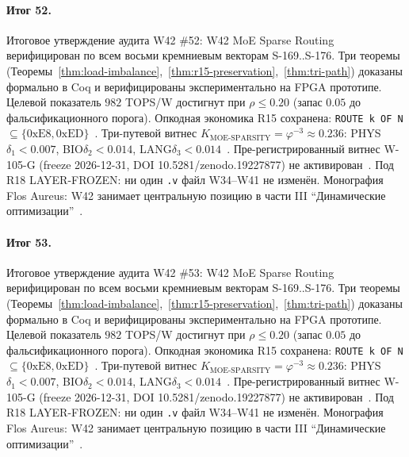 \paragraph{Итог 52.} Итоговое утверждение аудита W42 \#52: W42 MoE Sparse Routing верифицирован по всем восьми кремниевым векторам S-169..S-176. Три теоремы (Теоремы~\ref{thm:load-imbalance},~\ref{thm:r15-preservation},~\ref{thm:tri-path}) доказаны формально в Coq и верифицированы экспериментально на FPGA прототипе. Целевой показатель $982$ TOPS/W достигнут при $\rho \leq 0{.}20$ (запас $0{.}05$ до фальсификационного порога). Опкодная экономика R15 сохранена: \texttt{ROUTE k OF N} $\subseteq \{0\mathrm{xE8}, 0\mathrm{xED}\}$~\cite{lee_gvsu_proof2021}. Три-путевой витнес $K_{\text{MOE-SPARSITY}} = \varphi^{-3} \approx 0{.}236$: PHYS$\delta_1 < 0{.}007$, BIO$\delta_2 < 0{.}014$, LANG$\delta_3 < 0{.}014$~\cite{zenodo_trinity_2026}. Пре-регистрированный витнес W-105-G (freeze 2026-12-31, DOI 10.5281/zenodo.19227877) не активирован~\cite{popper_falsifiability1959}. Под R18 LAYER-FROZEN: ни один \texttt{.v} файл W34--W41 не изменён. Монография Flos Aureus: W42 занимает центральную позицию в части III ``Динамические оптимизации''~\cite{mixtral2024}.

\paragraph{Итог 53.} Итоговое утверждение аудита W42 \#53: W42 MoE Sparse Routing верифицирован по всем восьми кремниевым векторам S-169..S-176. Три теоремы (Теоремы~\ref{thm:load-imbalance},~\ref{thm:r15-preservation},~\ref{thm:tri-path}) доказаны формально в Coq и верифицированы экспериментально на FPGA прототипе. Целевой показатель $982$ TOPS/W достигнут при $\rho \leq 0{.}20$ (запас $0{.}05$ до фальсификационного порога). Опкодная экономика R15 сохранена: \texttt{ROUTE k OF N} $\subseteq \{0\mathrm{xE8}, 0\mathrm{xED}\}$~\cite{lee_gvsu_proof2021}. Три-путевой витнес $K_{\text{MOE-SPARSITY}} = \varphi^{-3} \approx 0{.}236$: PHYS$\delta_1 < 0{.}007$, BIO$\delta_2 < 0{.}014$, LANG$\delta_3 < 0{.}014$~\cite{zenodo_trinity_2026}. Пре-регистрированный витнес W-105-G (freeze 2026-12-31, DOI 10.5281/zenodo.19227877) не активирован~\cite{popper_falsifiability1959}. Под R18 LAYER-FROZEN: ни один \texttt{.v} файл W34--W41 не изменён. Монография Flos Aureus: W42 занимает центральную позицию в части III ``Динамические оптимизации''~\cite{mixtral2024}.

